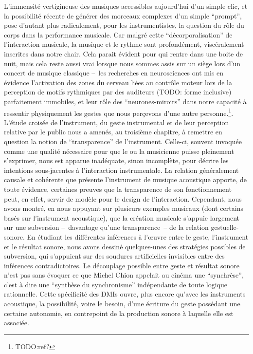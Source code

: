 L'immensité vertigineuse des musiques accessibles aujourd'hui d'un simple clic, et la possibilité récente de générer des morceaux complexes d'un simple ``prompt'', pose d'autant plus radicalement, pour les instrumentistes, la question du rôle du corps dans la performance musicale. Car malgré cette ``décorporalisation'' de l'interaction musicale, la musique et le rythme sont profondément, viscéralement inscrites dans notre chair. Cela parait évident pour qui rentre dans une boite de nuit, mais cela reste aussi vrai lorsque nous sommes assis sur un siège lors d'un concert de musique classique --~les recherches en neurosciences ont mis en évidence l'activation des zones du cerveau liées au contrôle moteur lors de la perception de motifs rythmiques par des auditeurs (TODO: forme inclusive) parfaitement immobiles, et leur rôle des ``neurones-miroirs'' dans notre capacité à ressentir physiquement les gestes que nous perçevons d'une autre personne.\footnote{TODO:ref?}.\\


\noindent L’étude croisée de l’instrument, du geste instrumental et de leur perception relative par le public nous a amenés, au troisième chapitre, à remettre en question la notion de ``transparence'' de l’instrument. Celle-ci, souvent invoquée comme une qualité nécessaire pour que le ou la musicienne puisse pleinement s’exprimer, nous est apparue inadéquate, sinon incomplète, pour décrire les intentions sous-jacentes à l’interaction instrumentale. La relation généralement causale et cohérente que présente l’instrument de musique acoustique apporte, de toute évidence, certaines preuves que la transparence de son fonctionnement peut, en effet, servir de modèle pour le design de l’interaction. Cependant, nous avons montré, en nous appuyant sur plusieurs exemples musicaux (dont certains basés sur l’instrument acoustique), que la création musicale s’appuie largement sur une subversion --~davantage qu’une transparence~-- de la relation gestuelle-sonore. En étudiant les différentes inférences à l’œuvre entre le geste, l’instrument et le résultat sonore, nous avons dessiné quelques-unes des stratégies possibles de subversion, qui s’appuient sur des soudures artificielles invisibles entre des inférences contradictoires. Le découplage possible entre geste et résultat sonore n'est pas sans évoquer ce que Michel Chion appelait au cinéma une ``synchrèse'', c'est à dire une ``synthèse du synchronisme'' indépendante de toute logique rationnelle\cite{chion_audio-vision:_2013}. Cette spécificité des \glspl{DMI} ouvre, plus encore qu'avec les instruments acoustique, la possibilité, voire le besoin, d'une écriture du geste possédant une certaine autonomie, en contrepoint de la production sonore à laquelle elle est associée.

